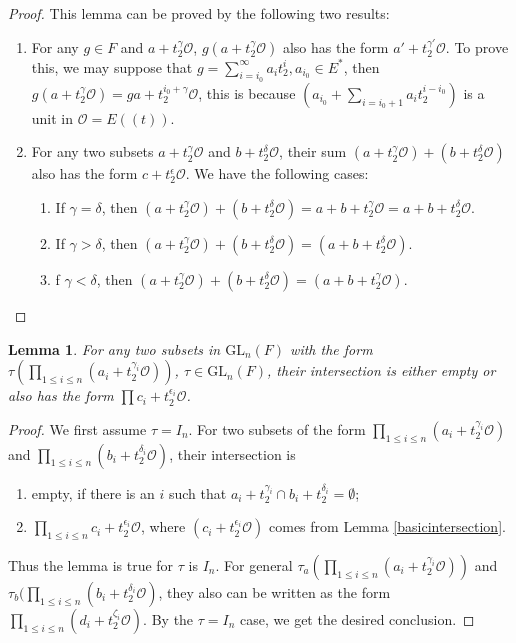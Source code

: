 \documentclass{amsart}
\newtheorem{lemma}[theorem]{Lemma}
\theoremstyle{definition}
\theoremstyle{remark}
\numberwithin{equation}{section}
\def  \GL        {\mathrm{GL}}
\def  \co       {\mathcal{O}}
\begin{document}
\begin{proof}
	This  lemma	 can be proved by the following two results:
	\begin{enumerate}
		\item  For any  $g \in F$ and  $a+ t_2^{\gamma} \co$,  $g(a+ t_2^{\gamma}\co)$ also has the form $a'+ t_2^{\gamma'}\co$.  To prove this,	 we may suppose that $ g =\sum^{\infty}_{i=i_0} a_i t_2 ^i, a_{i_0}\in E^*$, then $g(a+ t_2^{\gamma} \co)= ga +t_2^{i_0+\gamma}\co$, this is because $(a_{i_0}+ \sum_{i=i_0+1} a_i t_2^{i-i_0})$ is a unit in $\co= E((t))$. 
		
		
		\item For any  two subsets $a+ t_2^{\gamma} \co$ and $b+ t_2^{\delta} \co$, their sum  $(a+ t_2^{\gamma} \co)+(b+ t_2^{\delta} \co)$ also has the form $c+ t_2^{\epsilon} \co$.  We have the following cases:
		\begin{enumerate}
			\item If $\gamma= \delta$, then $(a+ t_2^{\gamma} \co)+(b+ t_2^{\delta} \co)= a+b+ t_2^{\gamma} \co = a+b+ t_2^{\delta}\co$.
			\item If $\gamma>\delta$, then $(a+ t_2^{\gamma} \co)+(b+ t_2^{\delta} \co) = (a+ b+ t_2^{\delta} \co)$.
			\item f $\gamma< \delta$, then $(a+ t_2^{\gamma} \co)+(b+ t_2^{\delta} \co) = (a+ b+ t_2^{\gamma} \co)$.
		\end{enumerate}
	\end{enumerate}
\end{proof}
\begin{lemma}\label{intersection}
	For any two subsets in $\GL_n(F)$ with the form $ \tau(\prod_{1 \leq i \leq n} (a_i + t_2^{\gamma_{i}} \co))$,  $\tau \in \GL_n(F)$, their intersection is either empty or also has the form $ \prod c_{i} + t_2^{\epsilon_{i}} \co $.
\end{lemma}

\begin{proof}
	We first assume  $\tau = I_n$. For two subsets of the form $\prod_{1\leq i\leq n}(a_i+ t_2^{\gamma_{i} }\co)  $  and $ \prod _{1 \leq i \leq n}(b_{i} + t_2^{\delta_{i}} \co)$, their intersection is
	\begin{enumerate}
		\item empty, if there is an $i$ such that $a_{i}+ t_2^{\gamma_{i}} \cap  b_{i}+ t_2^{\delta_{i} }  =\emptyset$;
		\item    $\prod_{1 \leq i\leq n} c_{i} + t_2^{\epsilon_{i}} \co $, where  $(c_{i} + t_2^{\epsilon_{i}} \co)$  comes from Lemma \ref{basicintersection}.
	\end{enumerate}
	Thus the lemma is true for $\tau$ is $I_n$.
	For general $\tau_a (\prod_{1 \leq i \leq n} (a_i + t_2^{\gamma_{i}} \co)  )$  and  $\tau_b(\prod_{1 \leq i \leq n} (b_i + t_2^{\delta_{i}} \co) $, they  also  can be written as the form  $\prod_{1 \leq i \leq n} (d_i + t_2^{\zeta_{i}} \co) $. By the  $\tau= I_n $ case,  we get the desired conclusion.
\end{proof}
\end{document}
